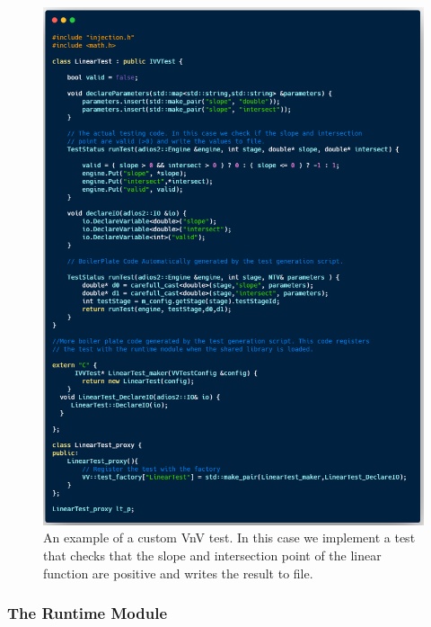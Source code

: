 \begin{figure}
\centering
 \includegraphics[height=0.9\textheight, width=\textwidth]{./narrative/figures/test-examp.png}
 \caption{An example of a custom VnV test. In this case we implement a test that checks that the slope and intersection point of the linear function are positive and writes
 the result to file. \label{test-examp}}
\end{figure}

\subsubsection{The Runtime Module}

